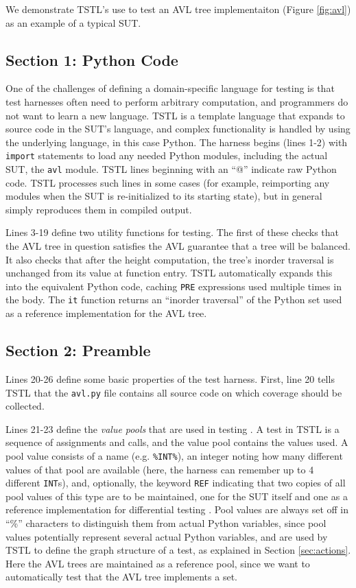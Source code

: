 \documentclass{sig-alternate}
\begin{document}
We demonstrate TSTL's use to test an AVL tree implementaiton (Figure \ref{fig:avl}) as an example of a typical SUT.


\subsection{Section 1: Python Code}

One of the challenges of defining a domain-specific language for
testing is that test harnesses often need to perform arbitrary
computation, and programmers do not want to learn a new language.
TSTL is a template language that expands to source code in the SUT's
language, and complex functionality is handled by using the underlying
language, in this case Python.  The harness begins (lines 1-2) with
{\tt import} statements to load any needed Python modules, including
the actual SUT, the {\tt avl} module.  TSTL lines beginning with an
``@'' indicate raw Python code.  TSTL processes such lines in some
cases (for example, reimporting any modules when the SUT is
re-initialized to its starting state), but in general simply
reproduces them in compiled output.  

Lines 3-19 define two utility functions for testing.  The first of
these checks that the AVL tree in question satisfies the AVL guarantee
that a tree will be balanced. It also checks that after the height
computation, the tree's inorder traversal is unchanged from its value
at function entry.  TSTL automatically expands this into the
equivalent Python code, caching {\tt PRE} expressions used multiple
times in the body.  The {\tt it} function returns an ``inorder
traversal'' of the Python set used as a reference implementation for the AVL
tree.

\subsection{Section 2: Preamble}

Lines 20-26 define some basic properties of the test harness.  First,
line 20 tells TSTL that the {\tt avl.py} file contains all source code
on which coverage should be collected.

Lines 21-23 define the \emph{value pools} that are used in testing
\cite{AndrewsTR,UDITA}.  A test in TSTL is a sequence of assignments
and calls, and the value pool contains the values used.  A pool value
consists of a name (e.g. {\tt \%INT\%}), an integer noting how many
different values of that pool are available (here, the harness can
remember up to 4 different {\tt INT}s), and, optionally, the keyword
{\tt REF} indicating that two copies of all pool values of this type
are to be maintained, one for the SUT itself and one as a reference
implementation for differential testing \cite{Differential,ICSEDiff}.
Pool values are always set off in ``\%'' characters to distinguish
them from actual Python variables, since pool values potentially
represent several actual Python variables, and are used by TSTL to
define the graph structure of a test, as explained in Section \ref{sec:actions}.
Here the AVL trees are maintained as a reference pool, since we want
to automatically test that the AVL tree implements a set.
\end{document}
